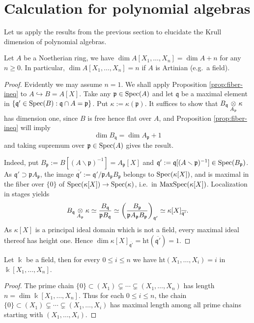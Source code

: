 \section{Calculation for polynomial algebras}
Let us apply the results from the previous section to elucidate the Krull dimension of polynomial algebras.

\begin{theorem}\label{prop:dim-polynomial-alg}
	Let $A$ be a Noetherian ring, we have $\dim A[X_1, \ldots, X_n] = \dim A + n$ for any $n \geq 0$. In particular, $\dim A[X_1, \ldots, X_n] = n$ if $A$ is Artinian (e.g.\ a field).
\end{theorem}
\begin{proof}
	Evidently we may assume $n=1$. We shall apply Proposition \ref{prop:fiber-ineq} to $A \hookrightarrow B = A[X]$. Take any $\mathfrak{p} \in \operatorname{Spec}(A)$ and let $\mathfrak{q}$ be a maximal element in $\{\mathfrak{q}' \in \operatorname{Spec}(B): \mathfrak{q} \cap A = \mathfrak{p} \}$. Put $\kappa := \kappa(\mathfrak{p})$. It suffices to show that $B_{\mathfrak{q}} \underset{A_{\mathfrak{p}}}{\otimes} \kappa$ has dimension one, since $B$ is free hence flat over $A$, and Proposition \ref{prop:fiber-ineq} will imply
	\[ \dim B_{\mathfrak{q}} = \dim A_{\mathfrak{p}} + 1 \]
	and taking supremum over $\mathfrak{p} \in \operatorname{Spec}(A)$ gives the result.
	
	Indeed, put $B_{\mathfrak{p}} := B[(A \smallsetminus \mathfrak{p})^{-1}] = A_{\mathfrak{p}}[X]$ and $\mathfrak{q}' := \mathfrak{q}[(A \smallsetminus \mathfrak{p})^{-1}] \in \operatorname{Spec}(B_{\mathfrak{p}})$. As $\mathfrak{q}' \supset \mathfrak{p}A_{\mathfrak{p}}$, the image $\overline{\mathfrak{q}'} := \mathfrak{q}'/\mathfrak{p}A_{\mathfrak{p}}B_{\mathfrak{p}}$ belongs to $\operatorname{Spec}(\kappa[X])$, and is maximal in the fiber over $\{0\}$ of $\operatorname{Spec}(\kappa[X]) \to \operatorname{Spec}(\kappa)$, i.e.\ in $\operatorname{MaxSpec}(\kappa[X])$. Localization in stages yields
	\[ B_{\mathfrak{q}} \underset{A_{\mathfrak{p}}}{\otimes} \kappa \simeq \frac{B_{\mathfrak{q}}}{\mathfrak{p} B_{\mathfrak{q}}} \simeq \left( \frac{B_{\mathfrak{p}}}{ \mathfrak{p} A_{\mathfrak{p}} B_{\mathfrak{p}}} \right)_{\mathfrak{q}' } \simeq \kappa[X]_{\overline{\mathfrak{q}'}}. \]
	As $\kappa[X]$ is a principal ideal domain which is not a field, every maximal ideal thereof has height one. Hence $\dim \kappa[X]_{\overline{\mathfrak{q}'}} = \mathrm{ht}(\overline{\mathfrak{q}'}) = 1$.
\end{proof}

\begin{corollary}\label{prop:poly-alg-ht}
	Let $\Bbbk$ be a field, then for every $0 \leq i \leq n$ we have $\mathrm{ht}(X_1, \ldots, X_i) = i$ in $\Bbbk[X_1, \ldots, X_n]$.
\end{corollary}
\begin{proof}
	The prime chain $\{0\} \subset (X_1) \subsetneq \cdots \subsetneq (X_1, \ldots, X_n)$ has length $n = \dim \Bbbk[X_1, \ldots, X_n]$. Thus for each $0 \leq i \leq n$, the chain $\{0\} \subset (X_1) \subsetneq \cdots \subsetneq (X_1, \ldots, X_i)$ has maximal length among all prime chains starting with $(X_1, \ldots, X_i)$.
\end{proof}

